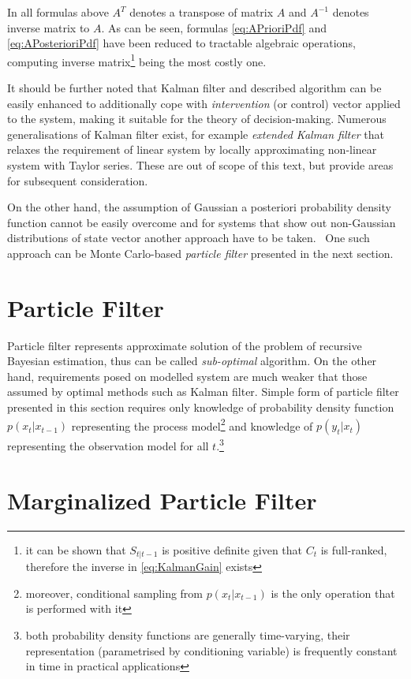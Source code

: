 \documentclass[a4paper,12pt,oneside]{report}
\newcommand{\pdf}{probability density function}
\newcommand{\pdfs}{probability density functions}
\begin{document}
In all formulas above \(A^T\) denotes a transpose of matrix \(A\) and \(A^{-1}\) denotes inverse
matrix to \(A\). As can be seen, formulas \eqref{eq:APrioriPdf} and \eqref{eq:APosterioriPdf} have
been reduced to tractable algebraic operations, computing inverse matrix\footnote{it can be shown
that \(S_{t|t-1}\) is positive definite given that \(C_t\) is full-ranked,
therefore the inverse in \eqref{eq:KalmanGain} exists} being the most costly one.

It should be further noted that Kalman filter and described algorithm can be easily enhanced to
additionally cope with \emph{intervention} (or control) vector applied to the system, making it
suitable for the theory of decision-making. Numerous generalisations of Kalman filter exist, for
example \emph{extended Kalman filter} that relaxes the requirement of linear system by locally
approximating non-linear system with Taylor series. These are out of scope of this
text, but provide areas for subsequent consideration.

On the other hand, the assumption of Gaussian a posteriori {\pdf} cannot be easily overcome and for
systems that show out non-Gaussian distributions of state vector another approach have to be
taken.~\cite{AruMasGor:02} One such approach can be Monte Carlo-based \emph{particle filter}
presented in the next section.

\section{Particle Filter}

Particle filter represents approximate solution of the problem of recursive Bayesian estimation,
thus can be called \emph{sub-optimal} algorithm. On the other hand, requirements posed on modelled
system are much weaker that those assumed by optimal methods such as Kalman filter. Simple form of
particle filter presented in this section requires only knowledge of {\pdf} \(p(x_t|x_{t-1})\)
representing the process model\footnote{moreover, conditional sampling from \(p(x_t|x_{t-1})\) is
the only operation that is performed with it} and knowledge of \(p(y_t|x_t)\) representing the observation model for all \(t\).\footnote{both
{\pdfs} are generally time-varying, their representation (parametrised by conditioning variable) is
frequently constant in time in practical applications}

\section{Marginalized Particle Filter}
\end{document}

